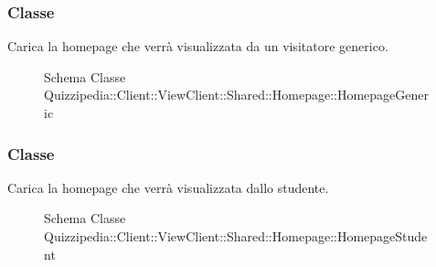 \subsubsection{Classe }
Carica la homepage che verrà visualizzata da un visitatore generico.
\begin{figure}[H]
\centering
\noindent{}
\caption[Schema Classe HomepageGeneric]{Schema Classe Quizzipedia::Client::ViewClient::Shared::Homepage::HomepageGeneric}
\end{figure}
\subsubsection{Classe }
Carica la homepage che verrà visualizzata dallo studente.
\begin{figure}[H]
\centering
\noindent{}
\caption[Schema Classe HomepageStudent]{Schema Classe Quizzipedia::Client::ViewClient::Shared::Homepage::HomepageStudent}
\end{figure}
